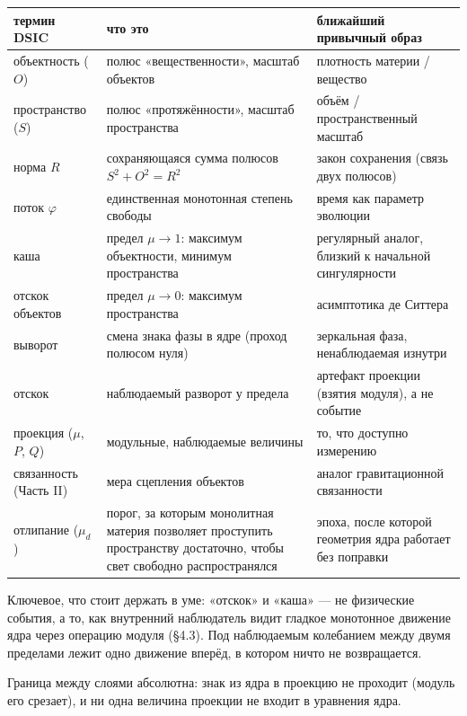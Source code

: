 \documentclass{article}
\begin{document}
\begin{table}[htbp]
\centering
\small
\begin{tabular}{@{}p{2.4cm}p{3.2cm}p{3.2cm}@{}}
\toprule
\textbf{термин DSIC} & \textbf{что это} & \textbf{ближайший привычный образ} \\
\midrule
объектность ($O$) & полюс «вещественности», масштаб объектов & плотность материи / вещество \\
\addlinespace
пространство ($S$) & полюс «протяжённости», масштаб пространства & объём / пространственный масштаб \\
\addlinespace
норма $R$ & сохраняющаяся сумма полюсов $S^2 + O^2 = R^2$ & закон сохранения (связь двух полюсов) \\
\addlinespace
поток $\varphi$ & единственная монотонная степень свободы & время как параметр эволюции \\
\addlinespace
каша & предел $\mu \to 1$: максимум объектности, минимум пространства & регулярный аналог, близкий к начальной сингулярности \\
\addlinespace
отскок объектов & предел $\mu \to 0$: максимум пространства & асимптотика де Ситтера \\
\addlinespace
выворот & смена знака фазы в ядре (проход полюсом нуля) & зеркальная фаза, ненаблюдаемая изнутри \\
\addlinespace
отскок & наблюдаемый разворот у предела & артефакт проекции (взятия модуля), а не событие \\
\addlinespace
проекция ($\mu$, $P$, $Q$) & модульные, наблюдаемые величины & то, что доступно измерению \\
\addlinespace
связанность (Часть II) & мера сцепления объектов & аналог гравитационной связанности \\
\addlinespace
отлипание ($\mu_d$) & порог, за которым монолитная материя позволяет проступить пространству достаточно, чтобы свет свободно распространялся & эпоха, после которой геометрия ядра работает без поправки \\
\bottomrule
\end{tabular}
\end{table}

Ключевое, что стоит держать в уме: «отскок» и «каша» --- не физические события, а то, как внутренний наблюдатель видит гладкое монотонное движение ядра через операцию модуля (\S4.3). Под наблюдаемым колебанием между двумя пределами лежит одно движение вперёд, в котором ничто не возвращается.

Граница между слоями абсолютна: знак из ядра в проекцию не проходит (модуль его срезает), и ни одна величина проекции не входит в уравнения ядра.
\end{document}
